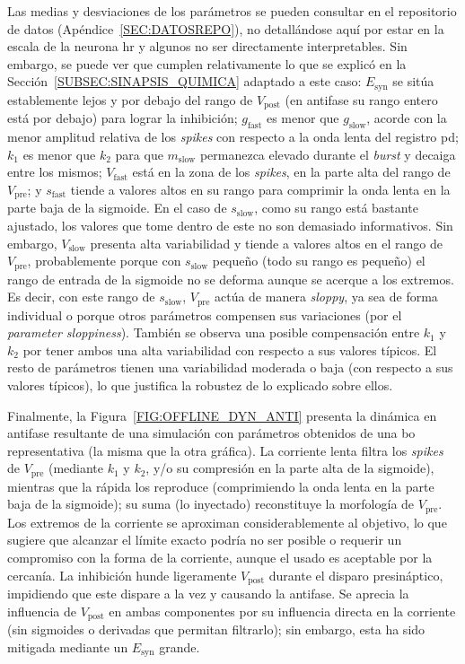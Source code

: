 Las medias y desviaciones de los parámetros se pueden consultar en el repositorio de datos (Apéndice~\ref{SEC:DATOSREPO}), no detallándose aquí por estar en la escala de la neurona \ac{hr} y algunos no ser directamente interpretables. Sin embargo, se puede ver que cumplen relativamente lo que se explicó en la Sección~\ref{SUBSEC:SINAPSIS_QUIMICA} adaptado a este caso: $E_{\mathrm{syn}}$ se sitúa establemente lejos y por debajo del rango de $V_{\mathrm{post}}$ (en antifase su rango entero está por debajo) para lograr la inhibición; $g_{\mathrm{fast}}$ es menor que $g_{\mathrm{slow}}$, acorde con la menor amplitud relativa de los \textit{spikes} con respecto a la onda lenta del registro \ac{pd}; $k_1$ es menor que $k_2$ para que $m_{\mathrm{slow}}$ permanezca elevado durante el \textit{burst} y decaiga entre los mismos; $V_{\mathrm{fast}}$ está en la zona de los \textit{spikes}, en la parte alta del rango de $V_{\mathrm{pre}}$; y $s_{\mathrm{fast}}$ tiende a valores altos en su rango para comprimir la onda lenta en la parte baja de la sigmoide. En el caso de $s_{\mathrm{slow}}$, como su rango está bastante ajustado, los valores que tome dentro de este no son demasiado informativos. Sin embargo, $V_{\mathrm{slow}}$ presenta alta variabilidad y tiende a valores altos en el rango de $V_{\mathrm{pre}}$, probablemente porque con $s_{\mathrm{slow}}$ pequeño (todo su rango es pequeño) el rango de entrada de la sigmoide no se deforma aunque se acerque a los extremos. Es decir, con este rango de $s_{\mathrm{slow}}$,  \(V_{\mathrm{pre}}\) actúa de manera \textit{sloppy}, ya sea de forma individual o porque otros parámetros compensen sus variaciones (por el \textit{parameter sloppiness}). También se observa una posible compensación entre $k_1$ y $k_2$ por tener ambos una alta variabilidad con respecto a sus valores típicos. El resto de parámetros tienen una variabilidad moderada o baja (con respecto a sus valores típicos), lo que justifica la robustez de lo explicado sobre ellos.

Finalmente, la Figura~\ref{FIG:OFFLINE_DYN_ANTI} presenta la dinámica en antifase resultante de una simulación con parámetros obtenidos de una \ac{bo} representativa (la misma que la otra gráfica). La corriente lenta filtra los \textit{spikes} de $V_{\mathrm{pre}}$ (mediante $k_1$ y $k_2$, y/o su compresión en la parte alta de la sigmoide), mientras que la rápida los reproduce (comprimiendo la onda lenta en la parte baja de la sigmoide); su suma (lo inyectado) reconstituye la morfología de $V_{\mathrm{pre}}$. Los extremos de la corriente se aproximan considerablemente al objetivo, lo que sugiere que alcanzar el límite exacto podría no ser posible o requerir un compromiso con la forma de la corriente, aunque el usado es aceptable por la cercanía. La inhibición hunde ligeramente $V_{\mathrm{post}}$ durante el disparo presináptico, impidiendo que este dispare a la vez y causando la antifase. Se aprecia la influencia de $V_{\mathrm{post}}$ en ambas componentes por su influencia directa en la corriente (sin sigmoides o derivadas que permitan filtrarlo); sin embargo, esta ha sido mitigada mediante un $E_{\mathrm{syn}}$ grande.


